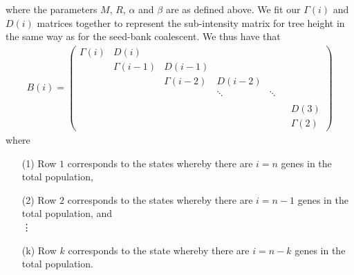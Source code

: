 \documentclass[12pt,a4paper]{article}
\begin{document}
where the parameters $M$, $R$, $\alpha$ and $\beta$ are as defined above. We fit our $\Gamma(i)$ and $D(i)$ matrices together to represent the sub-intensity matrix for tree height in the same way as for the seed-bank coalescent. We thus have that 
\begin{align*}
B(i) = \begin{pmatrix}
\Gamma(i) & D(i) & & & \\
          & \Gamma(i-1) & D(i-1) & & & \\
          &             & \Gamma(i-2) & D(i-2) & & & \\
          & & & \ddots & \ddots & & \\
          & & & & & & \\
          & & & & & & D(3)\\
          & & & & & & \Gamma(2)
\end{pmatrix}
\end{align*}
where
\begin{enumerate}
    \item[(1)] Row $1$ corresponds to the states whereby there are $i=n$ genes in the total population,
    \item[(2)] Row $2$ corresponds to the states whereby there are $i=n-1$ genes in the total population, and \\
    
    \: \vdots
    
    \item[(k)] Row $k$ corresponds to the state whereby there are $i=n-k$ genes in the total population.
\end{enumerate}





\clearpage


\end{document}
